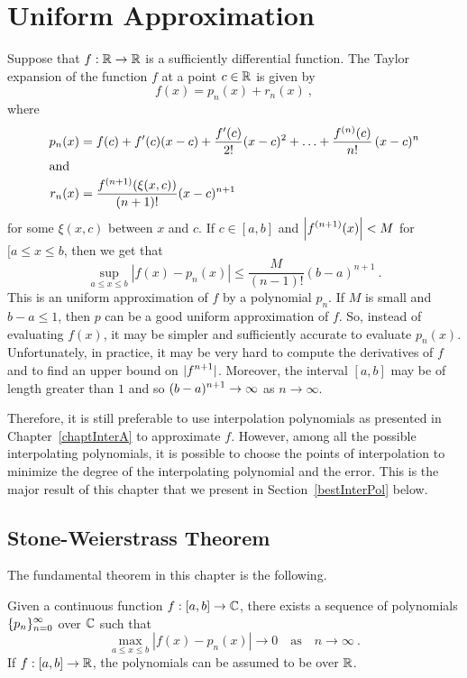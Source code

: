 \chapter{Uniform Approximation} \label{chaptApproxB}

Suppose that $f:\mathbb{R} \to \mathbb{R}$ is a sufficiently differential function.
The Taylor expansion of the function $f$ at a point $c \in \mathbb{R}$ is
given by
\[
  f(x) = p_n(x) + r_n(x) \ ,
\]
where
\begin{align*}
p_n(x) &= f(c) + f'(c)(x-c) + \frac{f'(c)}{2!}(x-c)^2 + \ldots
+ \frac{f^{(n)}(c)}{n!} \, (x-c)^n\\
\intertext{and}
r_n(x) &= \frac{f^{(n+1)}(\xi(x,c))}{(n+1)!}(x-c)^{n+1}
\end{align*}
for some $\xi(x,c)$ between $x$ and $c$.  If $c \in [a,b]$ and
$\displaystyle \left|f^{(n+1)}(x)\right| < M$ for $[a\leq x \leq b$,
then we get that
\[
  \sup_{a\leq x \leq b} |f(x) - p_n(x)| \leq \frac{M}{(n-1)!}(b-a)^{n+1} \ .
\]
This is an uniform approximation of $f$ by a polynomial $p_n$.  If $M$
is small and $b-a \leq 1$, then $p$ can be a good uniform
approximation of $f$.  So, instead of evaluating $f(x)$, it may be
simpler and sufficiently accurate to evaluate $p_n(x)$.
Unfortunately, in practice, it may be very hard to compute the
derivatives of $f$ and to find an upper bound on $\displaystyle |f^{n+1}|$.
Moreover, the interval $[a,b]$ may be of length greater than $1$ and
so $\displaystyle (b-a)^{n+1} \to \infty$ as $n \to \infty$.

Therefore, it is still preferable to use interpolation polynomials
as presented in Chapter~\ref{chaptInterA} to approximate $f$.
However, among all the possible interpolating polynomials, it is
possible to choose the points of interpolation to minimize the degree
of the interpolating polynomial and the error.
This is the major result of this chapter that we present in
Section~\ref{bestInterPol} below.

\section{Stone-Weierstrass Theorem}

The fundamental theorem in this chapter is the following.

\begin{theorem}
Given a continuous function $f:[a,b] \to \mathbb{C}$, there exists a sequence
of polynomials $\displaystyle \{p_n\}_{n=0}^\infty$ over $\mathbb{C}$ such that
\[
  \max_{a\leq x \leq b} |f(x)-p_n(x)| \to 0 \quad \text{as}
  \quad n \to \infty \ .
\]
If $f:[a,b]\to \mathbb{R}$, the polynomials can be assumed to be over $\mathbb{R}$.
\label{SWtheorem}
\end{theorem}

